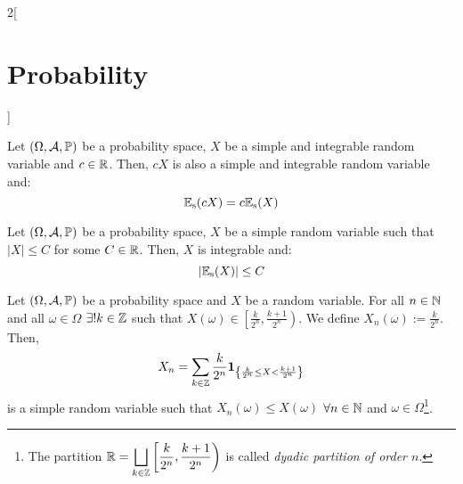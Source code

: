 \documentclass[../../../main.tex]{subfiles}
\begin{document}
\begin{multicols}{2}[\section{Probability}]
\begin{prop}
  \end{prop}
  \begin{prop}
    Let $(\Omega,\mathcal{A},\mathbb{P})$ be a probability space, $X$ be a simple and integrable random variable and $c\in\mathbb{R}$. Then, $cX$ is also a simple and integrable random variable and: $$\mathbb{E}_\text{s}(cX)=c\mathbb{E}_\text{s}(X)$$
  \end{prop}
  \begin{prop}
    Let $(\Omega,\mathcal{A},\mathbb{P})$ be a probability space, $X$ be a simple random variable such that $|X|\leq C$ for some $C\in\mathbb{R}$. Then, $X$ is integrable and: $$|\mathbb{E}_\text{s}(X)|\leq C$$
  \end{prop}
  \begin{prop}
    Let $(\Omega,\mathcal{A},\mathbb{P})$ be a probability space and $X$ be a random variable. For all $n\in\mathbb{N}$ and all $\omega\in\Omega$ $\exists! k\in\mathbb{Z}$ such that $X(\omega)\in\left[\frac{k}{2^n},\frac{k+1}{2^n}\right)$. We define $X_n(\omega):=\frac{k}{2^n}$. Then, $$X_n=\sum_{k\in\mathbb{Z}}\frac{k}{2^n}\boldsymbol{\mathrm{1}}_{\left\{\frac{k}{2^n}\leq X< \frac{k+1}{2^n}\right\}}$$ is a simple random variable such that $X_n(\omega)\leq X(\omega)$ $\forall n\in\mathbb{N}$ and $\omega\in \Omega$\footnote{The partition $\displaystyle\mathbb{R}=\bigsqcup_{k\in\mathbb{Z}}\left[\frac{k}{2^n},\frac{k+1}{2^n}\right)$ is called \emph{dyadic partition of order $n$}.}.
  \end{prop}

\end{multicols}
\end{document}

